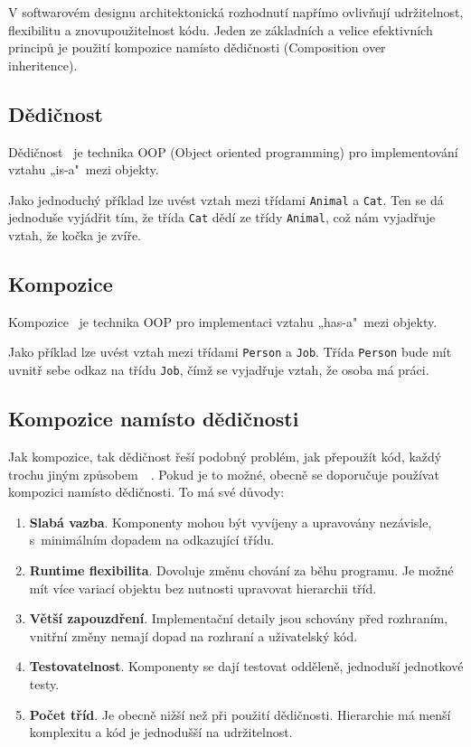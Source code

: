 V softwarovém designu architektonická rozhodnutí napřímo ovlivňují udržitelnost, flexibilitu a znovupoužitelnost kódu. Jeden ze základních a velice efektivních principů je použití kompozice namísto dědičnosti (Composition over inheritence).~\cite{ReusabilityPrinciples}

\subsection{Dědičnost}

Dědičnost~\cite{CompositionInheritence} je technika OOP (Object oriented programming) pro implementování vztahu „is-a"~mezi objekty.

Jako jednoduchý příklad lze uvést vztah mezi třídami \texttt{Animal} a \texttt{Cat}. Ten se dá jednoduše vyjádřit tím, že třída \texttt{Cat} dědí ze třídy \texttt{Animal}, což nám vyjadřuje vztah, že kočka je zvíře.

\subsection{Kompozice}
\label{Composition}

Kompozice~\cite{CompositionInheritence} je technika OOP pro implementaci vztahu „has-a"~mezi objekty.

Jako příklad lze uvést vztah mezi třídami \texttt{Person} a \texttt{Job}. Třída \texttt{Person} bude mít uvnitř sebe odkaz na třídu \texttt{Job}, čímž se vyjadřuje vztah, že osoba má práci.

\subsection{Kompozice namísto dědičnosti}

Jak kompozice, tak dědičnost řeší podobný problém, jak přepoužít kód, každý trochu jiným způsobem~\cite{CompositionInheritence}~\cite{ReusabilityPrinciples}. Pokud je to možné, obecně se doporučuje používat kompozici namísto dědičnosti. To má své důvody:

\begin{enumerate}
    \item \textbf{Slabá vazba}. Komponenty mohou být vyvíjeny a upravovány nezávisle, s~minimálním dopadem na odkazující třídu.
    \item \textbf{Runtime flexibilita}. Dovoluje změnu chování za běhu programu. Je možné mít více variací objektu bez nutnosti upravovat hierarchii tříd.
    \item \textbf{Větší zapouzdření}. Implementační detaily jsou schovány před rozhraním, vnitřní změny nemají dopad na rozhraní a uživatelský kód.
    \item \textbf{Testovatelnost}. Komponenty se dají testovat odděleně, jednoduší jednotkové testy.
    \item \textbf{Počet tříd}. Je obecně nižší než při použití dědičnosti. Hierarchie má menší komplexitu a kód je jednodušší na udržitelnost.
\end{enumerate}

